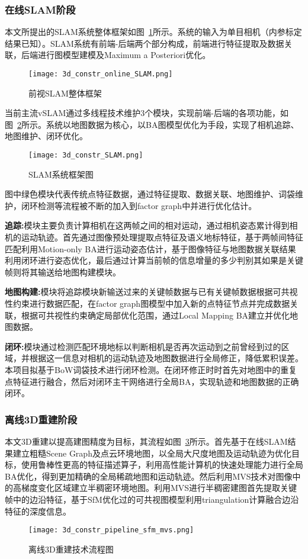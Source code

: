 \subsubsection{在线SLAM阶段}
\label{sec:3.3.3.1}
本文所提出的SLAM系统整体框架如图~\ref{fig:3d_constr_online_SLAM.png}所示。系统的输入为单目相机（内参标定结果已知）。SLAM系统有前端-后端两个部分构成，前端进行特征提取及数据关联，后端进行图模型建模及Maximum a Posteriori优化。
\begin{figure}[h] %
  \centering
  \texttt{[image: 3d\_constr\_online\_SLAM.png]}
  \caption{前视SLAM整体框架}
  \label{fig:3d_constr_online_SLAM.png}
\end{figure}
当前主流vSLAM通过多线程技术维护3个模块，实现前端-后端的各项功能，如图~\ref{fig:3d_constr_SLAM}所示。系统以地图数据为核心，以BA图模型优化为手段，实现了相机追踪、地图维护、闭环优化。
\begin{figure}[h] %
  \centering
  \texttt{[image: 3d\_constr\_SLAM.png]}
  \caption{SLAM系统框架图}
  \label{fig:3d_constr_SLAM}
\end{figure}
图中绿色模块代表传统点特征数据，通过特征提取、数据关联、地图维护、词袋维护，闭环检测等流程被不断的加入到factor graph中并进行优化估计。

\textbf{追踪:}模块主要负责计算相机在这两帧之间的相对运动，通过相机姿态累计得到相机的运动轨迹。首先通过图像预处理提取点特征及语义地标特征，基于两帧间特征匹配利用Motion-only BA进行运动姿态估计，基于图像特征与地图数据关联结果利用闭环进行姿态优化，最后通过计算当前帧的信息增量的多少判别其如果是关键帧则将其输送给地图构建模块。

\textbf{地图构建:}模块将追踪模块新输送过来的关键帧数据与已有关键帧数据根据可共视性约束进行数据匹配，在factor graph图模型中加入新的点特征节点并完成数据关联，根据可共视性约束确定局部优化范围，通过Local Mapping BA建立并优化地图数据。

\textbf{闭环:}模块通过检测匹配环境地标以判断相机是否再次运动到之前曾经到过的区域，并根据这一信息对相机的运动轨迹及地图数据进行全局修正，降低累积误差。本项目拟基于BoW词袋技术进行闭环检测。在闭环修正时时首先对地图中的重复点特征进行融合，然后对闭环主干网络进行全局BA，实现轨迹和地图数据的正确闭环。
\subsubsection{离线3D重建阶段}
\label{sec:3.3.3.2}
本文3D重建以提高建图精度为目标，其流程如图~\ref{fig:3d_constr_pipeline_sfm_mvs}所示。首先基于在线SLAM结果建立粗糙Scene Graph及点云环境地图，以全局大尺度地图及运动轨迹为优化目标，使用鲁棒性更高的特征描述算子，利用高性能计算机的快速处理能力进行全局BA优化，得到更加精确的全局稀疏地图和运动轨迹。然后利用MVS技术对图像中的高梯度变化区域建立半稠密环境地图。利用MVS进行半稠密建图首先提取关键帧中的边沿特征，基于SfM优化过的可共视图模型利用triangulation计算融合边沿特征的深度信息。 
\begin{figure}[h] %
  \centering
  \texttt{[image: 3d\_constr\_pipeline\_sfm\_mvs.png]}
  \caption{离线3D重建技术流程图}
  \label{fig:3d_constr_pipeline_sfm_mvs}
\end{figure}
